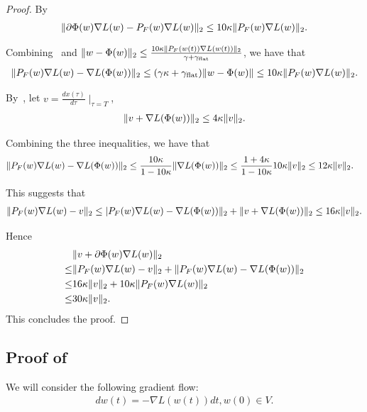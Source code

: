 \begin{proof}

By~
\begin{align*}
    \| \partial \Phi(w) \nabla L(w) - {P}_F(w) \nabla L(w) \|_2 \le 10\kappa \| {P}_F(w) \nabla L(w) \|_2.
\end{align*}

    Combining~ and $\| w- \Phi(w) \|_2 \le \frac{10 \kappa \| {P}_F(w(t)) \nabla L(w(t))\|_2}{\gamma + \gamma_{\mathrm{flat}}}$, we have that
    \begin{align*}
        \|  {P}_F(w) \nabla L(w) - \nabla L(\Phi(w)) \|_2 \le (\gamma \kappa + \gamma_{\mathrm{flat}}) \| w- \Phi(w) \| \le  10\kappa \| {P}_F(w) \nabla L(w) \|_2. 
    \end{align*}

By~, let $v =  \frac{d x(\tau)}{d\tau} \mid_{\tau = T}$,
\begin{align*}
    \| v  +  \nabla L(\Phi(w)) \|_2 \le 4\kappa  \|v   \|_2.
\end{align*}

Combining the three inequalities, we have that
\begin{align*}
    \| {P}_F(w) \nabla L(w) -\nabla L(\Phi(w))  \|_2 &\le \frac{10 \kappa}{1 - 10 \kappa}  \| \nabla L(\Phi(w)) \|_2 \le \frac{ 1 + 4\kappa }{1 - 10\kappa} 10 \kappa \| v\|_2 \le 12 \kappa \| v \|_2. 
\end{align*}

This suggests that
\begin{align*}
    \| {P}_F(w) \nabla L(w) - v\|_2 \le | {P}_F(w) \nabla L(w) -\nabla L(\Phi(w))  \|_2 + \| v  +  \nabla L(\Phi(w)) \|_2 \le 16 \kappa \| v\|_2.
\end{align*}

Hence 
\begin{align*}
    &\|  v +  \partial \Phi(w) \nabla L(w)  \|_2 \\ \le &
     \| {P}_F(w) \nabla L(w) - v\|_2 + \|  {P}_F(w) \nabla L(w) - \nabla L(\Phi(w)) \|_2 \\
     \le& 16 \kappa \| v\|_2 + 10 \kappa \|{P}_F(w) \nabla L(w) \|_2 \\
     \le& 30 \kappa \| v\|_2.
\end{align*}
This concludes the proof.
\end{proof}



\subsection{Proof of }
\label{app:gf}
We will consider the following gradient flow:
\begin{align}
\label{eq:gf}
    d w(t) = - \nabla L(w(t)) dt, w(0)  \in V.
\end{align}

